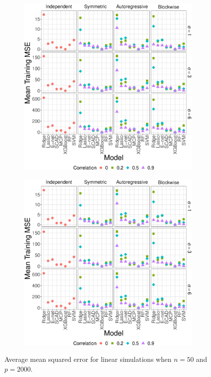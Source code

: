 \documentclass[final,onefignum,onetabnum]{siuro210301}
\begin{document}
	\begin{figure}[!htb]
		\centering
		\begin{subfigure}[b]{0.47\textwidth}
			\includegraphics[width=\textwidth]{images/facet/publication_facet_train_mse_linear_50_2000.eps}
			\label{fig:linear-test-mse}
		\end{subfigure}
		\hspace{6pt}
		\begin{subfigure}[b]{0.47\textwidth}
			\includegraphics[width=\textwidth]{images/facet/publication_facet_train_mse_linear_50_2000.eps}
			\label{fig:linear-train-mse}
		\end{subfigure}
		\caption{Average mean squared error for linear simulations when $n = 50$ and $p = 2000$.}
		\label{fig:linear-mse}
	\end{figure}
\end{document}
